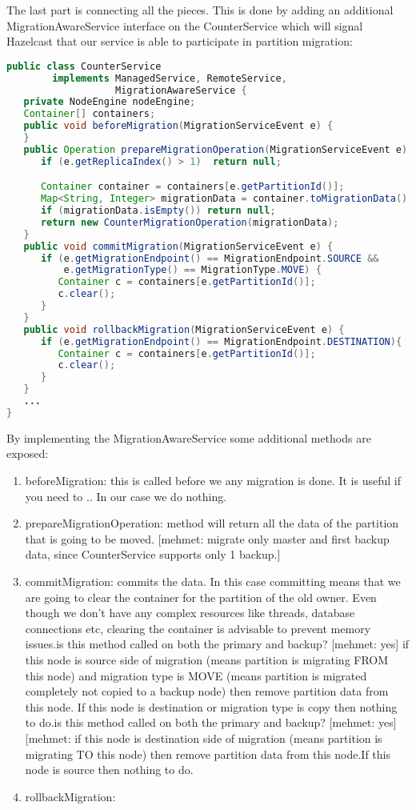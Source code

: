 The last part is connecting all the pieces. This is done by adding an additional MigrationAwareService interface on the CounterService which will signal Hazelcast that our service is able to participate in partition migration:
\begin{lstlisting}[language=java]
public class CounterService 
        implements ManagedService, RemoteService, 
                   MigrationAwareService {
   private NodeEngine nodeEngine;
   Container[] containers;
   public void beforeMigration(MigrationServiceEvent e) {
   } 
   public Operation prepareMigrationOperation(MigrationServiceEvent e) {
      if (e.getReplicaIndex() > 1)  return null;

      Container container = containers[e.getPartitionId()];
      Map<String, Integer> migrationData = container.toMigrationData();
      if (migrationData.isEmpty()) return null;
      return new CounterMigrationOperation(migrationData);
   }
   public void commitMigration(MigrationServiceEvent e) {
      if (e.getMigrationEndpoint() == MigrationEndpoint.SOURCE && 
          e.getMigrationType() == MigrationType.MOVE) {
         Container c = containers[e.getPartitionId()];
         c.clear();
      }
   }
   public void rollbackMigration(MigrationServiceEvent e) {
      if (e.getMigrationEndpoint() == MigrationEndpoint.DESTINATION){
         Container c = containers[e.getPartitionId()];
         c.clear();
      }
   }
   ...
}
\end{lstlisting}
By implementing the MigrationAwareService some additional methods are exposed:
\begin{enumerate}
\item beforeMigration: this is called before we any migration is done. It is useful if you need to .. In our case we do nothing.
\item prepareMigrationOperation: method will return all the data of the partition that is going to be moved.
[mehmet: migrate only master and first backup data, since CounterService supports only 1 backup.]
\item commitMigration: commits the data. In this case committing means that we are going to clear the container for the partition of the old owner. Even though we don't have any complex resources like threads, database connections etc, clearing the container is advisable to prevent memory issues.is this method called on both the primary and backup? [mehmet: yes] if this node is source side of migration (means partition is migrating FROM this node) and migration type is MOVE (means partition is migrated completely not copied to a backup node) then remove partition data from this node. If this node is destination or migration type is copy then nothing to do.is this method called on both the primary and backup? [mehmet: yes][mehmet: if this node is destination side of migration (means partition is migrating TO this node) then remove partition data from this node.If this node is source then nothing to do.
\item rollbackMigration: 
\end{enumerate}

